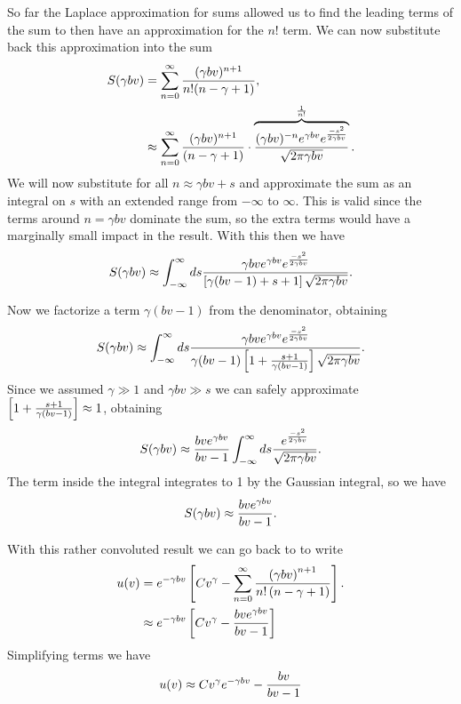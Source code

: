 So far the Laplace approximation for sums allowed us to find the leading terms
of the sum to then have an approximation for the $n!$ term. We can now
substitute back this approximation into the sum
\begin{align}
  S(\gamma b v) &= \sum_{n = 0}^{\infty} {(\gamma b v)^{n + 1} \over
                                        n! (n - \gamma + 1)},\\
  &\approx \sum_{n = 0}^{\infty}
  {(\gamma b v)^{n + 1} \over (n - \gamma + 1)} \cdot
  \overbrace{
  { (\gamma b v)^{-n} e^{\gamma b v} e^{-s^2 \over 2 \gamma b v}
  \over
  \sqrt{2 \pi \gamma b v}
  }}^{1 \over n!}.
\end{align}
We will now substitute for all $n \approx \gamma b v + s$ and approximate the
sum as an integral on $s$ with an extended range from $-\infty$ to $\infty$.
This is valid since the terms around $n = \gamma b v$ dominate the sum, so the
extra terms would have a marginally small impact in the result. With this then
we have
\begin{equation}
  S(\gamma b v) \approx \int_{-\infty}^{\infty} ds {
  \gamma b v e^{\gamma b v} e^{-s^2 \over 2 \gamma b v}
  \over
  \left[ \gamma (b v - 1) + s + 1 \right] \sqrt{2 \pi \gamma b v}
  }.
\end{equation}

Now we factorize a term $\gamma (b v - 1)$ from the denominator, obtaining
\begin{equation}
  S(\gamma b v) \approx \int_{-\infty}^{\infty} ds {
  \gamma b v e^{\gamma b v} e^{-s^2 \over 2 \gamma b v}
  \over
  \gamma (b v - 1) \left[ 1 + {s + 1 \over \gamma (b v - 1) }\right]
  \sqrt{2 \pi \gamma b v}
  }.
\end{equation}
Since we assumed $\gamma \gg 1$ and $\gamma b v \gg s$ we can safely approximate
$\left[ 1 + {s + 1 \over \gamma (b v - 1) }\right] \approx 1$, obtaining
\begin{equation}
  S(\gamma b v) \approx {b v e^{\gamma b v} \over b v - 1}
  \int_{-\infty}^{\infty} ds
  {e^{-s^2 \over 2 \gamma b v}
  \over
  \sqrt{2 \pi \gamma b v}}.
\end{equation}
The term inside the integral integrates to 1 by the Gaussian integral, so we
have
\begin{equation}
  S(\gamma b v) \approx {b v e^{\gamma b v} \over b v - 1}.
\end{equation}

With this rather convoluted result we can go back to  to
write
\begin{align}
  u(v) &= e^{-\gamma b v} \left[ C v^{\gamma}
  - \sum_{n=0}^\infty {\left( \gamma b v \right)^{n+1} \over
  n! \left( n - \gamma + 1 \right)} \right].\\
  &\approx e^{-\gamma b v}
  \left[ C v^{\gamma} - {b v e^{\gamma b v} \over b v - 1} \right]
\end{align}
Simplifying terms we have
\begin{equation}
  u(v) \approx C v^{\gamma} e^{-\gamma b v}
  - {b v \over b v - 1}
  \label{eq_SI_30_uofv}
\end{equation}

